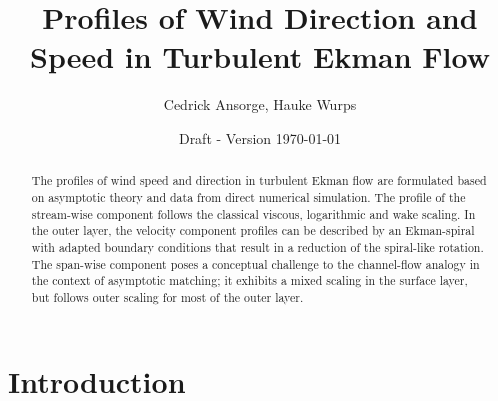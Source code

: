 \documentclass[a4paper,11pt]{amsart}
\date{\scriptsize Draft - Version \today}
\title{Profiles of Wind Direction and Speed in Turbulent Ekman Flow}
\author{Cedrick Ansorge, Hauke Wurps}
\begin{document}
 

\maketitle

\begin{abstract}
  The profiles of wind speed and direction in turbulent Ekman flow
  are formulated based on asymptotic theory and data from direct numerical simulation. 
  The profile of the stream-wise component follows the classical viscous, logarithmic and wake scaling.
  In the outer layer, the velocity component profiles can be described by an Ekman-spiral with adapted
  boundary conditions that result in a reduction of the spiral-like rotation. 
  The span-wise component poses a conceptual challenge to the channel-flow analogy
  in the context of asymptotic matching; it exhibits a mixed scaling in the surface layer, but follows
  outer scaling for most of the outer layer.
\end{abstract}
%
%
\section{Introduction}
\end{document}
